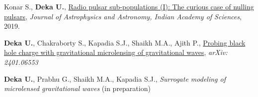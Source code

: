 \begin{itemize}[noitemsep]
{
\item Konar S., \textbf{Deka U.}, \href{https://www.ias.ac.in/article/fulltext/joaa/040/05/0042}{Radio pulsar sub-populations (I): The curious case of nulling pulsars}, \textit{Journal of Astrophysics and Astronomy, Indian Academy of Sciences}, 2019.
}\end{itemize}

\begin{itemize}[noitemsep]
{
\item \textbf{Deka U.}, Chakraborty S., Kapadia S.J., Shaikh M.A., Ajith P., \href{https://arxiv.org/pdf/2401.06553}{Probing black hole charge with gravitational microlensing of gravitational waves}, \textit{arXiv: 2401.06553}
}\end{itemize}

\begin{itemize}[noitemsep]
{
\item \textbf{Deka U.}, Prabhu G., Shaikh M.A., Kapadia S.J., \textit{Surrogate modeling of microlensed gravitational waves} (in preparation)
}\end{itemize}